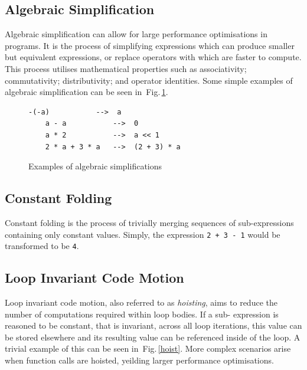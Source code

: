 \documentclass[12pt,openany,a4paper]{book}
\newcommand{\fig}[1]  {Fig.\,\ref{#1}}		%
\begin{document}
\subsection{Algebraic Simplification}
\label{as}

Algebraic simplification can allow for large performance optimisations in
programs. It is the process of simplifying expressions which can produce smaller
but equivalent expressions, or replace operators with which are faster to compute. 
This process utilises mathematical properties such as associativity; commutativity; 
distributivity; and operator identities. Some simple examples of algebraic
simplification can be seen in~\fig{simp}. 

\begin{figure}[htbp]
    \hspace{0.25\textwidth}
    \begin{minipage}[c]{0.5\linewidth}
    \begin{lstlisting}[frame=single, basicstyle=\ttfamily\small, tabsize=1, columns=fullflexible]
    -(-a)           -->  a
    a - a           -->  0
    a * 2           -->  a << 1
    2 * a + 3 * a   -->  (2 + 3) * a
    \end{lstlisting}
    \end{minipage}
    \caption{Examples of algebraic simplifications}
    \label{simp}
\end{figure}

\subsection{Constant Folding}
\label{cf}

Constant folding is the process of trivially merging sequences of sub-expressions 
containing only constant values. Simply, the expression \verb|2 + 3 - 1| would be 
transformed to be \verb|4|.

\subsection{Loop Invariant Code Motion}
\label{licm}

Loop invariant code motion, also referred to as \emph{hoisting}, aims to reduce
the number of computations required within loop bodies. If a sub-
expression is reasoned to be constant, that is invariant, across all loop iterations, 
this value can be stored elsewhere and its resulting value can be referenced inside of the
loop. A trivial example of this can be seen in~\fig{hoist}. More complex scenarios
arise when function calls are hoisted, yeilding larger performance optimisations.
\end{document}
